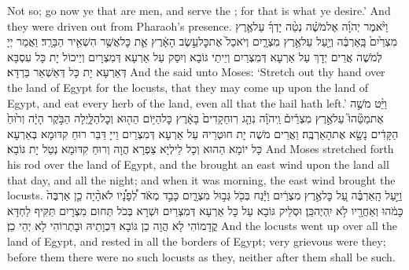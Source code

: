 {Not so; go now ye that are men, and serve the \lord; for that is what ye desire.’ And they were driven out from Pharaoh’s presence.}{}
{וַיֹּ֨אמֶר יְהֹוָ֜ה אֶל\maqqaf מֹשֶׁ֗ה נְטֵ֨ה יָדְךָ֜ עַל\maqqaf אֶ֤רֶץ מִצְרַ֙יִם֙ בָּֽאַרְבֶּ֔ה וְיַ֖עַל עַל\maqqaf אֶ֣רֶץ מִצְרָ֑יִם וְיֹאכַל֙ אֶת\maqqaf כׇּל\maqqaf עֵ֣שֶׂב הָאָ֔רֶץ אֵ֛ת כׇּל\maqqaf אֲשֶׁ֥ר הִשְׁאִ֖יר הַבָּרָֽד׃}
{וַאֲמַר יְיָ לְמֹשֶׁה אֲרֵים יְדָךְ עַל אַרְעָא דְּמִצְרַיִם וְיֵיתֵי גּוֹבָא וְיִסַּק עַל אַרְעָא דְּמִצְרָיִם וְיֵיכוֹל יָת כָּל עִסְבָּא דְּאַרְעָא יָת כָּל דְּאַשְׁאַר בַּרְדָּא׃}
{And the \lord\space said unto Moses: ‘Stretch out thy hand over the land of Egypt for the locusts, that they may come up upon the land of Egypt, and eat every herb of the land, even all that the hail hath left.’}{}
{וַיֵּ֨ט מֹשֶׁ֣ה אֶת\maqqaf מַטֵּ֘הוּ֮ עַל\maqqaf אֶ֣רֶץ מִצְרַ֒יִם֒ וַֽיהֹוָ֗ה נִהַ֤ג רֽוּחַ\maqqaf קָדִים֙ בָּאָ֔רֶץ כׇּל\maqqaf הַיּ֥וֹם הַה֖וּא וְכׇל\maqqaf הַלָּ֑יְלָה הַבֹּ֣קֶר הָיָ֔ה וְר֙וּחַ֙ הַקָּדִ֔ים נָשָׂ֖א אֶת\maqqaf הָאַרְבֶּֽה׃}
{וַאֲרֵים מֹשֶׁה יָת חוּטְרֵיהּ עַל אַרְעָא דְּמִצְרַיִם וַייָ דַּבַּר רוּחַ קִדּוּמָא בְּאַרְעָא כָּל יוֹמָא הַהוּא וְכָל לֵילְיָא צַפְרָא הֲוָה וְרוּחַ קִדּוּמָא נְטַל יָת גּוֹבָא׃}
{And Moses stretched forth his rod over the land of Egypt, and the \lord\space brought an east wind upon the land all that day, and all the night; and when it was morning, the east wind brought the locusts.}{}
{וַיַּ֣עַל הָֽאַרְבֶּ֗ה עַ֚ל כׇּל\maqqaf אֶ֣רֶץ מִצְרַ֔יִם וַיָּ֕נַח בְּכֹ֖ל גְּב֣וּל מִצְרָ֑יִם כָּבֵ֣ד מְאֹ֔ד לְ֠פָנָ֠יו לֹא\maqqaf הָ֨יָה כֵ֤ן אַרְבֶּה֙ כָּמֹ֔הוּ וְאַחֲרָ֖יו לֹ֥א יִֽהְיֶה\maqqaf כֵּֽן׃}
{וּסְלֵיק גּוֹבָא עַל כָּל אַרְעָא דְּמִצְרַיִם וּשְׁרָא בְּכֹל תְּחוּם מִצְרָיִם תַּקִּיף לַחְדָּא קֳדָמוֹהִי לָא הֲוָה כֵן גּוֹבָא דִּכְוָתֵיהּ וּבָתְרוֹהִי לָא יְהֵי כֵן׃}
{And the locusts went up over all the land of Egypt, and rested in all the borders of Egypt; very grievous were they; before them there were no such locusts as they, neither after them shall be such.}{}
